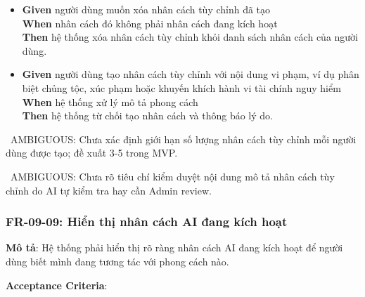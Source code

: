 \begin{itemize}
\item \textbf{Given} người dùng muốn xóa nhân cách tùy chỉnh đã tạo  \\ \hspace*{1.5em}  \textbf{When} nhân cách đó không phải nhân cách đang kích hoạt  \\ \hspace*{1.5em}  \textbf{Then} hệ thống xóa nhân cách tùy chỉnh khỏi danh sách nhân cách của người dùng.
\item \textbf{Given} người dùng tạo nhân cách tùy chỉnh với nội dung vi phạm, ví dụ phân biệt chủng tộc, xúc phạm hoặc khuyến khích hành vi tài chính nguy hiểm  \\ \hspace*{1.5em}  \textbf{When} hệ thống xử lý mô tả phong cách  \\ \hspace*{1.5em}  \textbf{Then} hệ thống từ chối tạo nhân cách và thông báo lý do.
\end{itemize}
\warningicon\  AMBIGUOUS: Chưa xác định giới hạn số lượng nhân cách tùy chỉnh mỗi người dùng được tạo; đề xuất 3-5 trong MVP.



\warningicon\  AMBIGUOUS: Chưa rõ tiêu chí kiểm duyệt nội dung mô tả nhân cách tùy chỉnh do AI tự kiểm tra hay cần Admin review.



\subsubsection{FR-09-09: Hiển thị nhân cách AI đang kích hoạt}

\textbf{Mô tả}: Hệ thống phải hiển thị rõ ràng nhân cách AI đang kích hoạt để người dùng biết mình đang tương tác với phong cách nào.



\textbf{Acceptance Criteria}:


